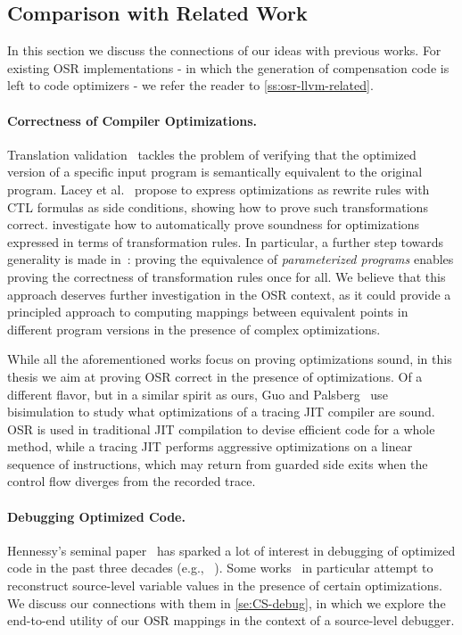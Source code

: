 \subsection{Comparison with Related Work}
In this section we discuss the connections of our ideas with previous works. For existing OSR implementations - in which the generation of compensation code is left to code optimizers - we refer the reader to \mysection\ref{ss:osr-llvm-related}.

\paragraph*{Correctness of Compiler Optimizations.} Translation validation~\cite{Pnueli98, Necula00} tackles the problem of verifying that the optimized version of a specific input program is semantically equivalent to the original program. Lacey et al.~\cite{Lacey02, Lacey04} propose to express optimizations as rewrite rules with CTL formulas as side conditions, showing how to prove such transformations correct. \cite{Lerner03, Lerner05, Kundu09} investigate how to automatically prove soundness for optimizations expressed in terms of transformation rules. In particular, a further step towards generality is made in~\cite{Kundu09}: proving the equivalence of {\em parameterized programs} enables proving the correctness of transformation rules once for all. We believe that this approach deserves further investigation in the OSR context, as it could provide a principled approach to computing mappings between equivalent points in different program versions in the presence of complex optimizations. 

While all the aforementioned works focus on proving optimizations sound, in this thesis we aim at proving OSR correct in the presence of optimizations. Of a different flavor, but in a similar spirit as ours, Guo and Palsberg~\cite{Guo11} use bisimulation to study what optimizations of a tracing JIT compiler are sound. OSR is used in traditional JIT compilation to devise efficient code for a whole method, while a tracing JIT performs aggressive optimizations on a linear sequence of instructions, which may return from guarded side exits when the control flow diverges from the recorded trace.

\paragraph*{Debugging Optimized Code.} Hennessy's seminal paper~\cite{Hennessy82} has sparked a lot of interest in debugging of optimized code in the past three decades (e.g., ~\cite{Coutant88, Adl-Tabatabai96, Wu99, Jaramillo00, Barr14}). Some works~\cite{Hennessy82, Wu99} in particular attempt to reconstruct source-level variable values in the presence of certain optimizations. We discuss our connections with them in \mysection\ref{se:CS-debug}, in which we explore the end-to-end utility of our OSR mappings in the context of a source-level debugger.

